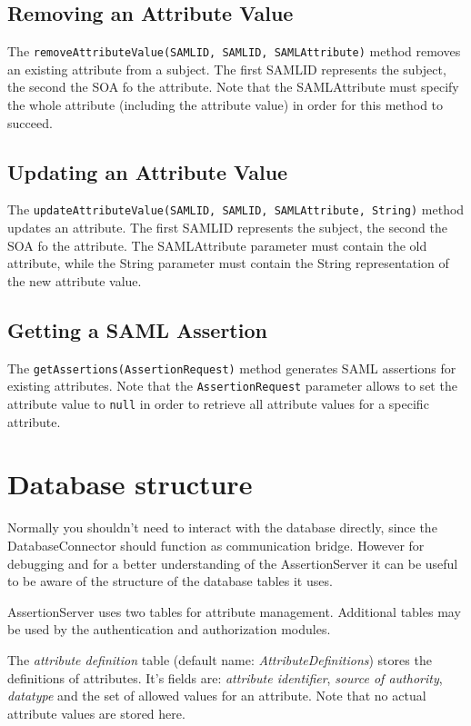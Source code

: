 \documentclass[10pt,a4paper]{article}
\begin{document}
\subsection{Removing an Attribute Value}
The \texttt{removeAttributeValue(SAMLID, SAMLID, SAMLAttribute)} method 
removes an existing attribute from a subject. The first SAMLID represents
the subject, the second the SOA fo the attribute. Note that the SAMLAttribute
must specify the whole attribute (including the attribute value) in order
for this method to succeed.

\subsection{Updating an Attribute Value}
The \texttt{updateAttributeValue(SAMLID, SAMLID, SAMLAttribute, String)} method
updates an attribute. The first SAMLID represents the subject, the second the 
SOA fo the attribute. The SAMLAttribute parameter must contain the old
attribute, while the String parameter must contain the String representation
of the new attribute value.

\subsection{Getting a SAML Assertion}
The \texttt{getAssertions(AssertionRequest)} method generates SAML assertions
for existing attributes. Note that the \texttt{AssertionRequest} parameter
allows to set the attribute value to \texttt{null} in order to retrieve all 
attribute values for a specific attribute.

\section{Database structure}
Normally you shouldn't need to interact with the database directly, since the
DatabaseConnector should function as communication bridge. However for 
debugging and for a better understanding of the AssertionServer it can be 
useful to be aware of the structure of the database tables it uses.

AssertionServer uses two tables for attribute management. Additional tables may
be used by the authentication and authorization modules.

The \emph{attribute definition} table (default name: 
\emph{AttributeDefinitions}) stores the definitions of attributes.
It's fields are: \emph{attribute identifier}, \emph{source of authority}, 
\emph{datatype} and the set of allowed values for an attribute. Note that no 
actual attribute values are stored here.
\end{document}
